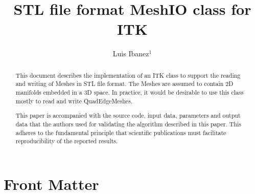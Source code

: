 \documentclass{InsightArticle}
\title{STL file format MeshIO class for ITK}
\author{Luis Ibanez$^{1}$}
\newcommand{\IJhandlerIDnumber}{1338}
\begin{document}
%
%
\IJhandlefooter{\IJhandlerIDnumber}




\ifpdf
\else
\fi


\maketitle


\ifhtml
\chapter*{Front Matter\label{front}}
\fi


\begin{abstract}
\noindent
This document describes the implementation of an ITK class to support the
reading and writing of Meshes in STL file format. The Meshes are assumed to
contain 2D manifolds embedded in a 3D space. In practice, it would be desirable
to use this class mostly to read and write QuadEdgeMeshes.

This paper is accompanied with the source code, input data, parameters and
output data that the authors used for validating the algorithm described in
this paper. This adheres to the fundamental principle that scientific
publications must facilitate reproducibility of the reported results.

\end{abstract}
\end{document}

